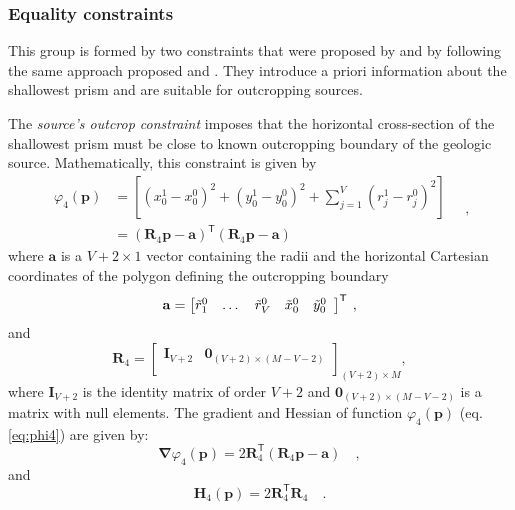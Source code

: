 \subsubsection{Equality constraints}

This group is formed by two constraints that were proposed by \cite{oliveirajr-etal2011} and \cite{oliveirajr-barbosa2013} by following the same approach proposed \cite{barbosa-etal1997} and 
\cite{barbosa-1999a}. They introduce a priori information about the shallowest prism and are  suitable for outcropping sources.

The \textit{source’s outcrop constraint} imposes that the horizontal cross-section of the shallowest prism 
must be close to known outcropping boundary of the geologic source. Mathematically, this constraint is given by
\begin{equation}\label{eq:phi4}
\begin{split}
\varphi_{4}(\mathbf{p}) &= \left[\left(x_{0}^{1} - x_{0}^{0}\right)^2 + \left(y_{0}^{1} - y_{0}^{0}\right)^2 + \sum\limits^{V}_{j=1}\left(r^{1}_{j}-r^{0}_{j}\right)^2\right] \\
&= \left(\mathbf{R}_{4} \mathbf{p} - \mathbf{a} \right)^{\mathsf{T}} 
\left(\mathbf{R}_{4} \mathbf{p} - \mathbf{a} \right)
\end{split} \quad ,
\end{equation}
where $\mathbf{a}$ is a $V+2 \times 1$ vector containing the radii and the horizontal Cartesian coordinates of the 
polygon defining the outcropping boundary
\begin{equation}
\mathbf{a} = \left[ \begin{array}{@{}*{12}{c}@{}}
\tilde{r}_{1}^{0} & \dots & \tilde{r}_{V}^{0} & \tilde{x}_{0}^{0} & \tilde{y}_{0}^{0} \\
\end{array} \right]^{\mathsf{T}} \: ,
\label{eq:a-vector}
\end{equation}
and
\begin{equation}
\mathbf{R}_{4} = 
\begin{bmatrix}
\mathbf{I}_{V+2} & \mathbf{0}_{(V+2) \times (M-V-2)} \\
\end{bmatrix}_{(V+2)\times M},
\label{eq:R4-matrix}
\end{equation}
where $\mathbf{I}_{V+2}$ is the identity matrix of order $V+2$ and $\mathbf{0}_{(V+2) \times (M-V-2)}$ is a matrix 
with null elements. The gradient and Hessian of function $\varphi_{4}(\mathbf{p})$ (eq. \ref{eq:phi4}) are given by:
\begin{equation}\label{eq:phi4_grad}
\boldsymbol{\nabla}\varphi_{4}(\mathbf{p}) = 2 \mathbf{R}_{4}^{\mathsf{T}} 
\left(\mathbf{R}_{4} \mathbf{p} - \mathbf{a} \right) \quad ,
\end{equation}
and
\begin{equation}\label{eq:phi4_hessian}
\mathbf{H}_{4}(\mathbf{p}) = 2 \mathbf{R}^{\mathsf{T}}_{4}\mathbf{R}_{4} \quad .
\end{equation}

